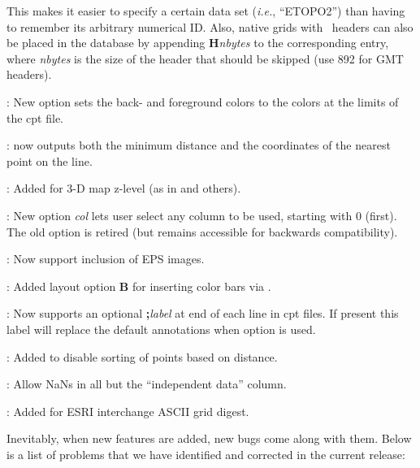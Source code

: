 \begin{description}
This makes it easier to specify a certain data set (\emph{i.e.}, ``ETOPO2'') than having to remember its arbitrary numerical
ID.  Also, native grids with \GMT\ headers can also be placed in the database by appending \textbf{H}\emph{nbytes} to the
corresponding  entry, where \emph{nbytes} is the size of the header that should be skipped
(use 892 for GMT headers).
\item [\GMTprog{makecpt}]: New option  sets the back- and foreground colors to the colors at the limits of the cpt file.
\item [\GMTprog{mapproject}]:  now outputs both the minimum distance and the coordinates
of the nearest point on the line.
\item [\GMTprog{pscoast}]: Added  for 3-D map z-level (as in  and others).
\item [\GMTprog{pshistogram}]: New option \emph{col} lets user select any column to be used, starting
with 0 (first).  The old  option is retired (but remains accessible for backwards compatibility).  
\item [\GMTprog{psimage}]: Now support inclusion of EPS images.
\item [\GMTprog{pslegend}]: Added layout option \textbf{B} for inserting color bars via .
\item [\GMTprog{psscale}]: Now supports an optional \textbf{;}\emph{label} at end of each line in cpt files.
If present this label will replace the default annotations when option  is used.
\item [\GMTprog{psxyz}]: Added  to disable sorting of points based on distance.
\item [\GMTprog{sample1d}]: Allow NaNs in all but the ``independent data'' column.
\item [\GMTprog{xyz2grd}]: Added  for ESRI interchange ASCII grid digest.
\end{description}

Inevitably, when new features are added, new bugs come along with them.  Below is a list of problems
that we have identified and corrected in the current release:

